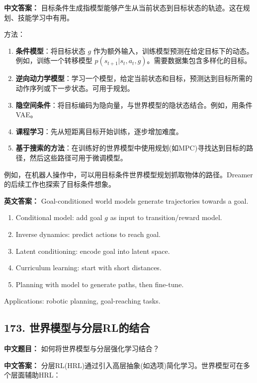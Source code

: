 \documentclass[10pt,a4paper]{ctexart}
\begin{document}
\textbf{中文答案：}  
目标条件生成指模型能够产生从当前状态到目标状态的轨迹。这在规划、技能学习中有用。

方法：
\begin{enumerate}
    \item \textbf{条件模型}：将目标状态 $g$ 作为额外输入，训练模型预测在给定目标下的动态。例如，训练一个转移模型 $p(s_{t+1} | s_t, a_t, g)$。需要数据集包含多样化的目标。
    \item \textbf{逆向动力学模型}：学习一个模型，给定当前状态和目标，预测达到目标所需的动作序列或下一步状态。可用于规划。
    \item \textbf{隐空间条件}：将目标编码为隐向量，与世界模型的隐状态结合。例如，用条件VAE。
    \item \textbf{课程学习}：先从短距离目标开始训练，逐步增加难度。
    \item \textbf{基于搜索的方法}：在训练好的世界模型中使用规划(如MPC)寻找达到目标的路径，然后这些路径可用于微调模型。
\end{enumerate}

例如，在机器人操作中，可以用目标条件世界模型规划抓取物体的路径。Dreamer的后续工作也探索了目标条件想象。

\textbf{英文答案：}  
Goal-conditioned world models generate trajectories towards a goal.

\begin{enumerate}
    \item Conditional model: add goal $g$ as input to transition/reward model.
    \item Inverse dynamics: predict actions to reach goal.
    \item Latent conditioning: encode goal into latent space.
    \item Curriculum learning: start with short distances.
    \item Planning with model to generate paths, then fine-tune.
\end{enumerate}

Applications: robotic planning, goal-reaching tasks.

\subsection*{173. 世界模型与分层RL的结合}
\textbf{中文题目：} 如何将世界模型与分层强化学习结合？

\textbf{中文答案：}  
分层RL(HRL)通过引入高层抽象(如选项)简化学习。世界模型可在多个层面辅助HRL：
\end{document}
